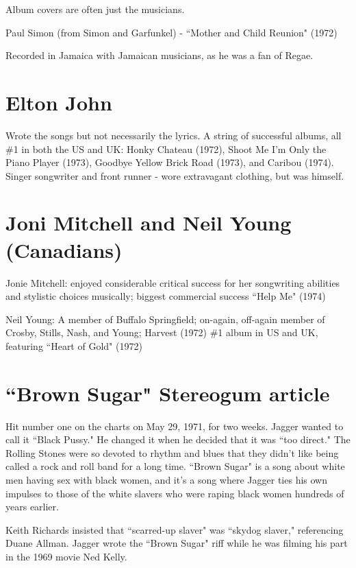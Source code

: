 \documentclass[12pt, a4paper, twoside, openright, titlepage]{book}
\begin{document}
Album covers are often just the musicians.

\begin{eg}{}{}
    Paul Simon (from Simon and Garfunkel) - ``Mother and Child Reunion" (1972)
\end{eg}

Recorded in Jamaica with Jamaican musicians, as he was a fan of Regae.


\section{Elton John}


Wrote the songs but not necessarily the lyrics. A string of successful albums, all \#1 in both the US and UK: Honky Chateau (1972), Shoot Me I'm Only the Piano Player (1973), Goodbye Yellow Brick Road (1973), and Caribou (1974). Singer songwriter and front runner - wore extravagant clothing, but was himself.

\section{Joni Mitchell and Neil Young (Canadians)}

Jonie Mitchell: enjoyed considerable critical success for her songwriting abilities and stylistic choices musically; biggest commercial success ``Help Me" (1974)


Neil Young: A member of Buffalo Springfield; on-again, off-again member of Crosby, Stills, Nash, and Young; Harvest (1972) \#1 album in US and UK, featuring ``Heart of Gold" (1972)








\section{``Brown Sugar" Stereogum article}

Hit number one on the charts on May 29, 1971, for two weeks. Jagger wanted to call it ``Black Pussy." He changed it when he decided that it was ``too direct." The Rolling Stones were so devoted to rhythm and blues that they didn't like being called a rock and roll band for a long time. ``Brown Sugar" is a song about white men having sex with black women, and it's a song where Jagger ties his own impulses to those of the white slavers who were raping black women hundreds of years earlier. 

Keith Richards insisted that ``scarred-up slaver" was ``skydog slaver," referencing Duane Allman. Jagger wrote the ``Brown Sugar" riff while he was filming his part in the 1969 movie Ned Kelly. 
\end{document}

